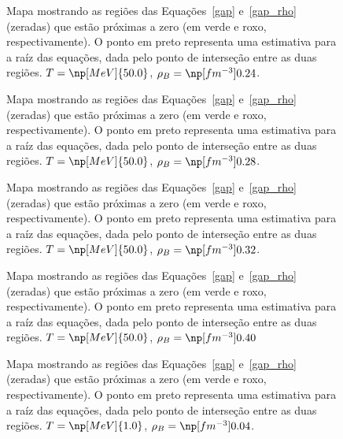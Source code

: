 \begin{figure}
	
	\caption{Mapa mostrando as regiões das Equações~\ref{gap} e~\ref{gap_rho} (zeradas) que estão próximas a zero (em verde e roxo, respectivamente). O ponto em preto representa uma estimativa para a raíz das equações, dada pelo ponto de interseção entre as duas regiões. $T = \np[MeV]{50.0}$, $\rho_B = \np[fm^{-3}]{0.24}$.\protect}
	\label{Fig:Map_9_5}
\end{figure}

\begin{figure}
	
	\caption{Mapa mostrando as regiões das Equações~\ref{gap} e~\ref{gap_rho} (zeradas) que estão próximas a zero (em verde e roxo, respectivamente). O ponto em preto representa uma estimativa para a raíz das equações, dada pelo ponto de interseção entre as duas regiões. $T = \np[MeV]{50.0}$, $\rho_B = \np[fm^{-3}]{0.28}$.\protect}
	\label{Fig:Map_9_6}
\end{figure}

\begin{figure}
	
	\caption{Mapa mostrando as regiões das Equações~\ref{gap} e~\ref{gap_rho} (zeradas) que estão próximas a zero (em verde e roxo, respectivamente). O ponto em preto representa uma estimativa para a raíz das equações, dada pelo ponto de interseção entre as duas regiões. $T = \np[MeV]{50.0}$, $\rho_B = \np[fm^{-3}]{0.32}$.\protect}
	\label{Fig:Map_9_7}
\end{figure}

\begin{figure}
	
	\caption{Mapa mostrando as regiões das Equações~\ref{gap} e~\ref{gap_rho} (zeradas) que estão próximas a zero (em verde e roxo, respectivamente). O ponto em preto representa uma estimativa para a raíz das equações, dada pelo ponto de interseção entre as duas regiões. $T = \np[MeV]{50.0}$, $\rho_B = \np[fm^{-3}]{0.40}$\protect}
	\label{Fig:Map_9_8}
\end{figure}

\FloatBarrier

\begin{figure}
	
	\caption{Mapa mostrando as regiões das Equações~\ref{gap} e~\ref{gap_rho} (zeradas) que estão próximas a zero (em verde e roxo, respectivamente). O ponto em preto representa uma estimativa para a raíz das equações, dada pelo ponto de interseção entre as duas regiões. $T = \np[MeV]{1.0}$, $\rho_B = \np[fm^{-3}]{0.04}$.\protect}
	\label{Fig:Map_0_0}
\end{figure}

